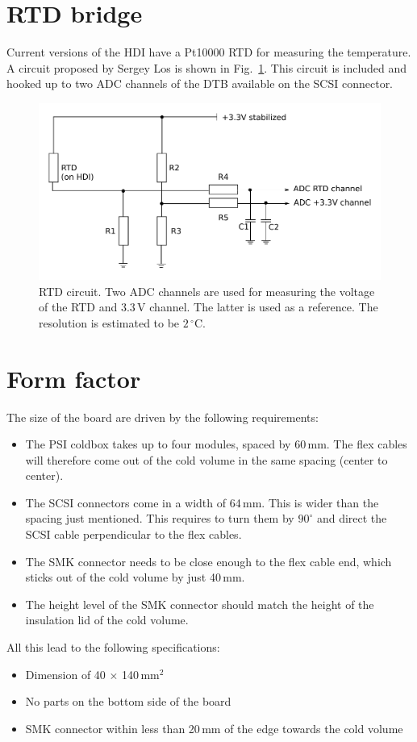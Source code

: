 \section{RTD bridge}
Current versions of the HDI have a Pt10000 RTD for measuring the temperature. A circuit proposed by Sergey Los is shown in Fig.~\ref{fig:RTDcircuit}. This circuit is included and hooked up to two ADC channels of the DTB available on the SCSI connector.

\begin{figure}[hbtp]
	\begin{center}
	\includegraphics[width=.7\textwidth]{img/RTDcircuit.pdf}
	\end{center}
	\caption{RTD circuit. Two ADC channels are used for measuring the voltage of the RTD and 3.3\,V channel. The latter is used as a reference. The resolution is estimated to be $2\,^\circ$C.}
	\label{fig:RTDcircuit}
\end{figure}


\section{Form factor}

The size of the board are driven by the following requirements:
\begin{itemize}
    \item The PSI coldbox takes up to four modules, spaced by 60\,mm. The flex cables will therefore come out of the cold volume in the same spacing (center to center).
    \item The SCSI connectors come in a width of 64\,mm. This is wider than the spacing just mentioned. This requires to turn them by $90^\circ$ and direct the SCSI cable perpendicular to the flex cables.
    \item The SMK connector needs to be close enough to the flex cable end, which sticks out of the cold volume by just 40\,mm.
    \item The height level of the SMK connector should match the height of the insulation lid of the cold volume.
\end{itemize}
All this lead to the following specifications:
\begin{itemize}
    \item Dimension of 40 $\times$ 140\,mm$^2$
    \item No parts on the bottom side of the board
    \item SMK connector within less than 20\,mm of the edge towards the cold volume
\end{itemize}

